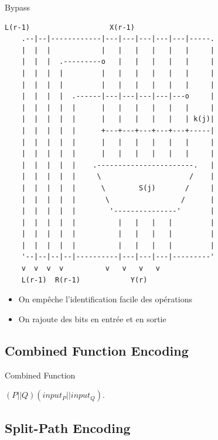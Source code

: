\documentclass{beamer}
\begin{document}
\begin{frame}[fragile]{Bypass}

  \begin{Verbatim}[samepage=true]
    L(r-1)                   X(r-1)
    .--|--|------------|---|---|---|---|---|-----.
    |  |  |            |   |   |   |   |   |     |
    |  |  |  .---------o   |   |   |   |   |     |
    |  |  |  |         |   |   |   |   |   |     |   
    |  |  |  |         |   |   |   |   |   |     |  
    |  |  |  |  .------|---|---|---|---|---o     | 
    |  |  |  |  |      |   |   |   |   |   |     | 
    |  |  |  |  |      |   |   |   |   |   | k(j)|  
    |  |  |  |  |      +---+---+---+---+---+-----|  
    |  |  |  |  |      |   |   |   |   |   |     | 
    |  |  |  |  |      |   |   |   |   |   |     | 
    |  |  |  |  |    .-----------------------.   |              
    |  |  |  |  |     \                     /    |              
    |  |  |  |  |      \        S(j)       /     |              
    |  |  |  |  |       \                 /      |               
    |  |  |  |  |        '---------------'       |               
    |  |  |  |  |          |   |   |   |         |     
    |  |  |  |  |          |   |   |   |         | 
    |  |  |  |  |          |   |   |   |         |   
    '--|--|--|--|----------|---|---|---|---------'
    v  v  v  v          v   v   v   v 
    L(r-1)  R(r-1)            Y(r)
  \end{Verbatim}	

  \begin{itemize}
  \item On empêche l'identification facile des opérations
  \item On rajoute des bits en entrée et en sortie
  \end{itemize}

\end{frame}


\subsection{Combined Function Encoding}

\begin{frame}{Combined Function}
  \begin{center}
    $(P||Q)(input_P||input_Q)$.
  \end{center}
\end{frame}

\subsection{Split-Path Encoding}
\end{document}
